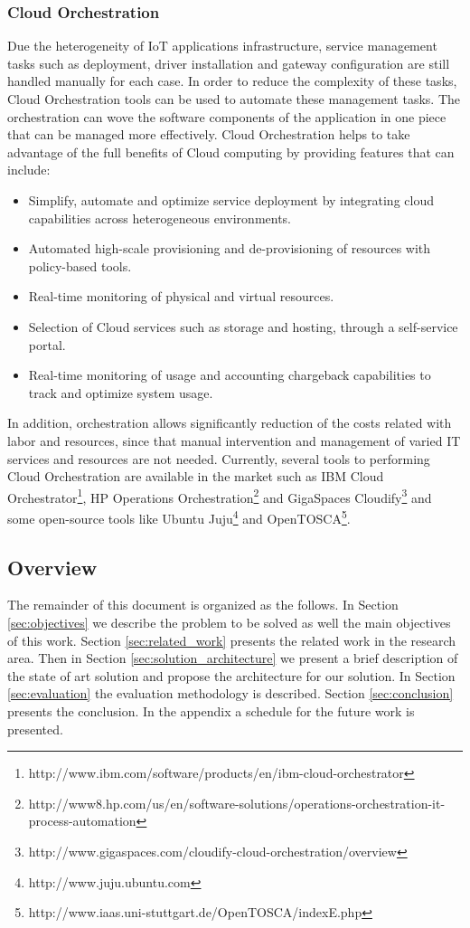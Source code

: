 \subsubsection{Cloud Orchestration}
\label{subs:cloud_orchestration}
Due the heterogeneity of IoT applications infrastructure, service management tasks
such as deployment, driver installation and gateway configuration are still handled
manually for each case. In order to reduce the complexity of these tasks, Cloud Orchestration
tools can be used to automate these management tasks. The orchestration can wove the
software components of the application in one piece that can be managed more effectively.
Cloud Orchestration helps to take advantage of the full benefits of Cloud computing by
providing features that can include:
\begin{itemize}
  \item Simplify, automate and optimize service deployment by integrating cloud capabilities
  across heterogeneous environments.
  \item Automated high-scale provisioning and de-provisioning of resources with policy-based tools.
  \item Real-time monitoring of physical and virtual resources.
  \item Selection of Cloud services such as storage and hosting, through a self-service portal.
  \item Real-time monitoring of usage and accounting chargeback capabilities to track and optimize system usage.
\end{itemize}
In addition, orchestration allows significantly reduction of the costs related with labor
and resources, since that manual intervention and management of varied IT services and resources
are not needed. Currently, several tools to performing Cloud Orchestration are available
in the market such as IBM Cloud Orchestrator\footnote{http://www.ibm.com/software/products/en/ibm-cloud-orchestrator},
HP Operations Orchestration\footnote{http://www8.hp.com/us/en/software-solutions/operations-orchestration-it-process-automation}
and GigaSpaces Cloudify\footnote{http://www.gigaspaces.com/cloudify-cloud-orchestration/overview}
and some open-source tools like Ubuntu Juju\footnote{http://www.juju.ubuntu.com}
and OpenTOSCA\footnote{http://www.iaas.uni-stuttgart.de/OpenTOSCA/indexE.php}.\\
\subsection{Overview}
\label{sub:overview}
The remainder of this document is organized as the follows. In Section \ref{sec:objectives}
we describe the problem to be solved as well the main objectives of this work. Section \ref{sec:related_work}
presents the related work in the research area. Then in Section \ref{sec:solution_architecture}
we present a brief description of the state of art solution and propose the architecture
for our solution. In Section \ref{sec:evaluation} the evaluation methodology is described.
Section \ref{sec:conclusion} presents the conclusion. In the appendix a schedule
for the future work is presented.
